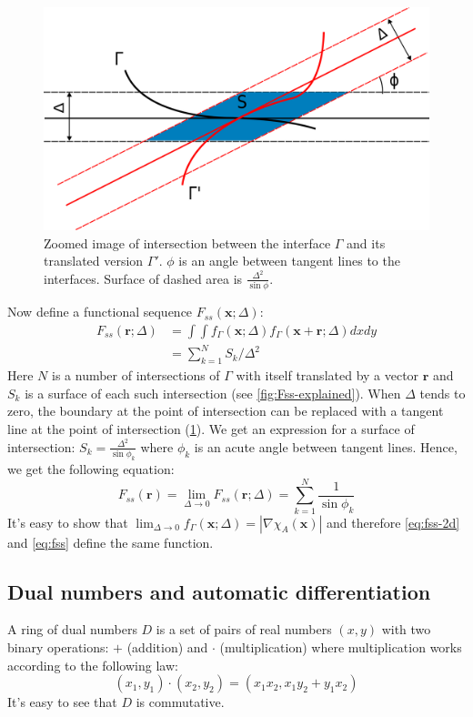 \documentclass[reprint,amsmath,amssymb,aps,pre,showkeys,showpacs]{revtex4-1}
\begin{document}
\begin{figure}
  \centering
  \includegraphics[width=0.8\linewidth]{images/fss-zoomed.png}
  \caption[]{Zoomed image of intersection between the interface $\Gamma$ and its
    translated version $\Gamma'$. $\phi$ is an angle between tangent lines to
    the interfaces. Surface of dashed area is $\frac{\Delta^2}{\sin \phi}$.}
  \label{fig:fss-zoomed}
\end{figure}
Now define a functional sequence $F_{ss}(\bm{x}; \Delta)$:
\begin{align*}
  F_{ss}(\bm{r}; \Delta) &= \int\int f_\Gamma(\bm{x}; \Delta) f_\Gamma(\bm{x}
  + \bm{r}; \Delta) dx dy \\
  &= \sum_{k=1}^N S_k/\Delta^2
\end{align*}
Here $N$ is a number of intersections of $\Gamma$ with itself translated by a
vector $\bm{r}$ and $S_k$ is a surface of each such intersection (see
\cref{fig:Fss-explained}).
When $\Delta$ tends to zero, the boundary at the point of intersection can
be replaced with a tangent line at the point of intersection
(\cref{fig:fss-zoomed}). We get an expression for a surface of
intersection: $S_k = \frac{\Delta^2}{\sin \phi_k}$ where $\phi_k$ is an
acute angle between tangent lines. Hence, we get the following equation:
\begin{equation}
  F_{ss}(\bm{r}) = \lim_{\Delta \to 0} F_{ss}(\bm{r}; \Delta) =
  \sum_{k=1}^N \frac{1}{\sin \phi_k} \label{eq:fss-2d}
\end{equation}
It's easy to show that
$\lim_{\Delta \to 0} f_\Gamma(\bm{x}; \Delta) = |\nabla \chi_A(\bm{x})|$
and therefore \cref{eq:fss-2d} and \cref{eq:fss} define the same function.

\subsection{Dual numbers and automatic differentiation}
\label{sec:dual}
A ring of dual numbers $D$ is a set of pairs of real numbers $(x, y)$ with two
binary operations: $+$ (addition) and $\cdot$ (multiplication) where
multiplication works according to the following law:
\begin{equation*}
  (x_1, y_1)\cdot(x_2, y_2) = (x_1x_2, x_1y_2 + y_1x_2)
\end{equation*}
It's easy to see that $D$ is commutative.
\end{document}

